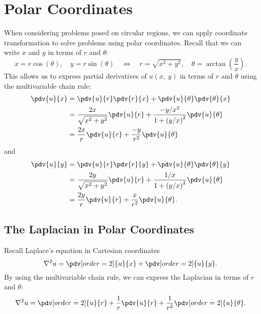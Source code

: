 \documentclass{article}
\begin{document}
\section{Polar Coordinates}
When considering problems posed on circular regions, we can apply coordinate transformation to solve problems using polar coordinates.
Recall that we can write \(x\) and \(y\) in terms of \(r\) and \(\theta\):
\begin{equation*}
    x = r \cos{\left( \theta \right)}, \quad y = r \sin{\left( \theta \right)} \quad \iff \quad r = \sqrt{x^2 + y^2}, \quad \theta = \arctan{\left( \frac{y}{x} \right)}.
\end{equation*}
This allows us to express partial derivatives of \(u\left( x, \: y \right)\) in terms of \(r\) and \(\theta\) using the multivariable chain rule:
\begin{align*}
    \pdv{u}{x} & = \pdv{u}{r} \pdv{r}{x} + \pdv{u}{\theta} \pdv{\theta}{x}                                        \\
               & = \frac{2x}{\sqrt{x^2 + y^2}} \pdv{u}{r} + \frac{-y/x^2}{1+\left( y/x \right)^2} \pdv{u}{\theta} \\
               & = \frac{2x}{r} \pdv{u}{r} + \frac{-y}{r^2} \pdv{u}{\theta}
\end{align*}
and
\begin{align*}
    \pdv{u}{y} & = \pdv{u}{r} \pdv{r}{y} + \pdv{u}{\theta} \pdv{\theta}{y}                                     \\
               & = \frac{2y}{\sqrt{x^2 + y^2}} \pdv{u}{r} + \frac{1/x}{1+\left( y/x \right)^2} \pdv{u}{\theta} \\
               & = \frac{2y}{r} \pdv{u}{r} + \frac{x}{r^2} \pdv{u}{\theta}.
\end{align*}
\subsection{The Laplacian in Polar Coordinates}
Recall Laplace's equation in Cartesian coordinates
\begin{equation*}
    \nabla^2 u = \pdv[order=2]{u}{x} + \pdv[order=2]{u}{y}.
\end{equation*}
By using the multivariable chain rule, we can express the Laplacian in terms of \(r\) and \(\theta\):
\begin{equation*}
    \nabla^2 u = \pdv[order=2]{u}{r} + \frac{1}{r} \pdv{u}{r} + \frac{1}{r^2} \pdv[order=2]{u}{\theta}.
\end{equation*}
\end{document}
